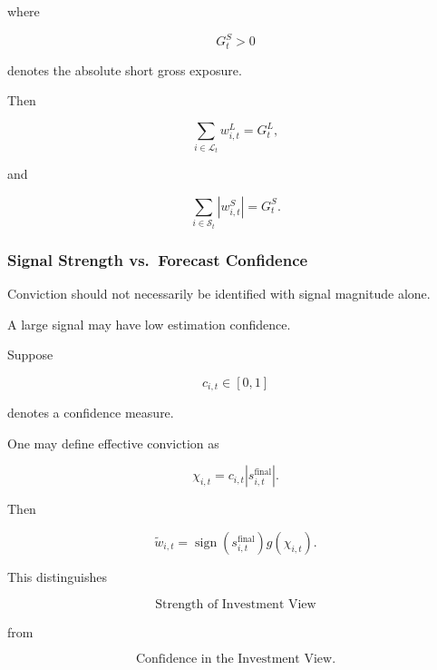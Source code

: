 \documentclass[11pt,a4paper]{article}
\begin{document}
where

\begin{equation}
G_t^{S}>0
\end{equation}

denotes the absolute short gross exposure.

Then

\begin{equation}
\sum_{i\in\mathcal{L}_t}
w_{i,t}^{L}
=
G_t^{L},
\end{equation}

and

\begin{equation}
\sum_{i\in\mathcal{S}_t}
|w_{i,t}^{S}|
=
G_t^{S}.
\end{equation}


\subsubsection{Signal Strength vs.\ Forecast Confidence}

Conviction should not necessarily be identified with signal magnitude alone.

A large signal may have low estimation confidence.

Suppose

\begin{equation}
c_{i,t}\in[0,1]
\end{equation}

denotes a confidence measure.

One may define effective conviction as

\begin{equation}
\boxed{
\chi_{i,t}
=
c_{i,t}
\left|
s_{i,t}^{\mathrm{final}}
\right|.
}
\end{equation}

Then

\begin{equation}
\widetilde{w}_{i,t}
=
\operatorname{sign}
\left(
s_{i,t}^{\mathrm{final}}
\right)
g(\chi_{i,t}).
\end{equation}

This distinguishes

\begin{equation}
\boxed{
\text{Strength of Investment View}
}
\end{equation}

from

\begin{equation}
\boxed{
\text{Confidence in the Investment View}.
}
\end{equation}
\end{document}
